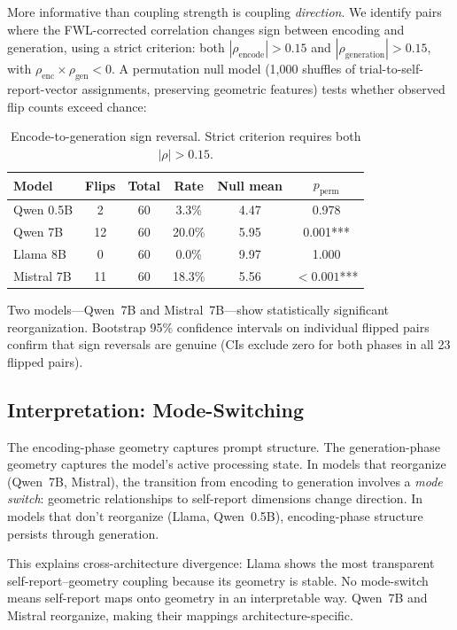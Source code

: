 \documentclass[11pt,a4paper]{article}
\begin{document}
More informative than coupling strength is coupling \emph{direction}. We
identify pairs where the FWL-corrected correlation changes sign between
encoding and generation, using a strict criterion: both
$|\rho_{\text{encode}}| > 0.15$ and $|\rho_{\text{generation}}| > 0.15$,
with $\rho_{\text{enc}} \times \rho_{\text{gen}} < 0$. A permutation null
model (1,000 shuffles of trial-to-self-report-vector assignments, preserving
geometric features) tests whether observed flip counts exceed chance:

\begin{table}[H]
\centering
\caption{Encode-to-generation sign reversal. Strict criterion requires both $|\rho| > 0.15$.}
\label{tab:sign_reversal}
\begin{tabular}{lccccc}
\toprule
\textbf{Model} & \textbf{Flips} & \textbf{Total} & \textbf{Rate} & \textbf{Null mean} & \textbf{$p_{\text{perm}}$} \\
\midrule
Qwen 0.5B  & 2  & 60 & 3.3\%  & 4.47 & 0.978 \\
Qwen 7B    & 12 & 60 & 20.0\% & 5.95 & 0.001*** \\
Llama 8B   & 0  & 60 & 0.0\%  & 9.97 & 1.000 \\
Mistral 7B & 11 & 60 & 18.3\% & 5.56 & ${<}0.001$*** \\
\bottomrule
\end{tabular}
\end{table}

Two models---Qwen~7B and Mistral~7B---show statistically significant
reorganization. Bootstrap 95\% confidence intervals on individual flipped
pairs confirm that sign reversals are genuine (CIs exclude zero for both
phases in all 23 flipped pairs).

\subsection{Interpretation: Mode-Switching}

The encoding-phase geometry captures prompt structure. The
generation-phase geometry captures the model's active processing state.
In models that reorganize (Qwen~7B, Mistral), the transition from
encoding to generation involves a \emph{mode switch}: geometric
relationships to self-report dimensions change direction. In models that
don't reorganize (Llama, Qwen~0.5B), encoding-phase structure persists
through generation.

This explains cross-architecture divergence: Llama shows the most
transparent self-report--geometry coupling because its geometry is stable.
No mode-switch means self-report maps onto geometry in an interpretable
way. Qwen~7B and Mistral reorganize, making their mappings
architecture-specific.
\end{document}
